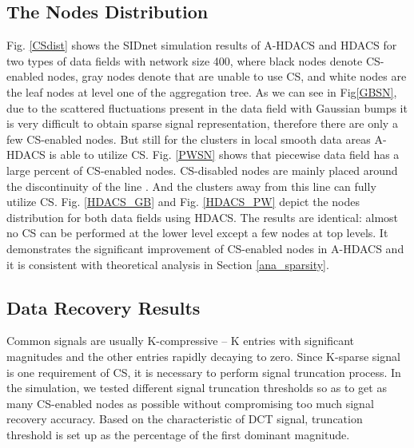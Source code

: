 \documentclass[conference]{IEEEtran}
\begin{document}
\subsection{The Nodes Distribution}
Fig. \ref{CSdist} shows the SIDnet simulation results of A-HDACS and HDACS 
for two types of data fields with network size 400, 
where black nodes denote CS-enabled nodes, gray nodes denote that are unable to use CS, and white nodes are the leaf nodes at level one of the aggregation tree. 
As we can see in Fig\ref{GBSN}, 
due to the scattered fluctuations present in the data field with Gaussian bumps  
it is very difficult to obtain sparse signal representation,  
therefore there are only a few CS-enabled nodes. But still for the clusters in 
local smooth data areas A-HDACS is able to utilize CS. 
Fig. \ref{PWSN} shows that 
piecewise data field has a large percent of CS-enabled nodes.
CS-disabled nodes are mainly placed around the discontinuity of the line . And the clusters away from this 
line can fully utilize CS.  Fig. \ref{HDACS_GB} and Fig. \ref{HDACS_PW} depict the nodes distribution for 
both data fields using HDACS. The results are identical: almost no CS can be performed at the lower level 
except a few nodes at top levels. It demonstrates the significant improvement of 
CS-enabled nodes in A-HDACS and it is consistent with theoretical analysis in Section \ref{ana_sparsity}.  

\begin{figure*}
\centering
{}
\qquad
{}
\qquad
{}
\qquad
{}
\caption{The SIDnet simulation results of A-HDACS and HDACS with network size 400: black nodes denote
CS-enabled nodes, gray nodes denote CS-disabled nodes, white nodes are the leaf nodes on level one,
and red node denotes the sink. }
\label{CSdist}
\end{figure*}

\subsection{Data Recovery Results}
Common signals are usually K-compressive -- K entries with significant magnitudes and the other entries rapidly 
decaying to zero. Since K-sparse signal is one requirement of CS, it is 
necessary to perform signal truncation process. In the simulation, we tested different 
signal truncation thresholds so as to get as many CS-enabled nodes as  
possible without compromising too much signal recovery accuracy. Based on the characteristic of DCT signal,
truncation threshold is set up as the percentage of the first dominant magnitude. 
\end{document}
